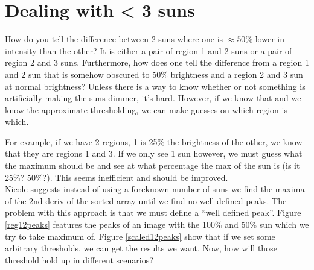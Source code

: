 \documentclass[10pt]{scrartcl}
\begin{document}
\section{Dealing with < 3 suns} %
\label{sec:dealing_with_3_suns}
How do you tell the difference between 2 suns where one is $\approx 50$\% lower in intensity than the other? It is either a pair of region 1 and 2 suns or a pair of region 2 and 3 suns. Furthermore, how does one tell the difference from a region 1 and 2 sun that is somehow obscured to 50\% brightness and a region 2 and 3 sun at normal brightness? Unless there is a way to know whether or not something is artificially making the suns dimmer, it's hard. However, if we know that and we know the approximate thresholding, we can make guesses on which region is which.

For example, if we have 2 regions, 1 is 25\% the brightness of the other, we know that they are regions 1 and 3. If we only see 1 sun however, we must guess what the maximum should be and see at what percentage the max of the sun is (is it 25\%? 50\%?). This seems inefficient and should be improved. \\

Nicole suggests instead of using a foreknown number of suns we find the maxima of the 2nd deriv of the sorted array until we find no well-defined peaks. The problem with this approach is that we must define a ``well defined peak''. Figure \ref{reg12peaks} features the peaks of an image with the 100\% and 50\% sun which we try to take maximum of. Figure \ref{scaled12peaks} show that if we set some arbitrary thresholds, we can get the results we want. Now, how will those threshold hold up in different scenarios?
\end{document}
